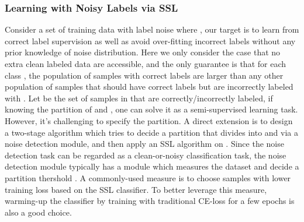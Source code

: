 \documentclass[letterpaper]{article} \usepackage{aaai22}  \usepackage{times}  \usepackage{helvet}  \usepackage{courier}  \usepackage[hyphens]{url}  \usepackage{graphicx} \usepackage{subfigure}
\begin{document}
\subsubsection{Learning with Noisy Labels via SSL}
Consider a set of training data with label noise  where , our target is to learn from correct label supervision as well as avoid over-fitting incorrect labels without any prior knowledge of noise distribution. Here we only consider the case that no extra clean labeled data are accessible, and the only guarantee is that for each class , the population of samples with correct labels are larger than any other population of samples that should have correct labels  but are incorrectly labeled with . Let  be the set of samples in  that are correctly/incorrectly labeled, if knowing the partition of  and , one can solve it as a semi-supervised learning task. However, it's challenging to specify the partition. A direct extension is to design a two-stage algorithm which tries to decide a partition that divides  into  and  via a noise detection module, and then apply an SSL algorithm on . Since the noise detection task can be regarded as a clean-or-noisy classification task, the noise detection module typically has a module which measures the dataset and decide a partition thershold . A commonly-used measure is to choose samples with lower training loss based on the SSL classifier. To better leverage this measure, warming-up the classifier by training with traditional CE-loss for a few epochs is also a good choice.
\end{document}
